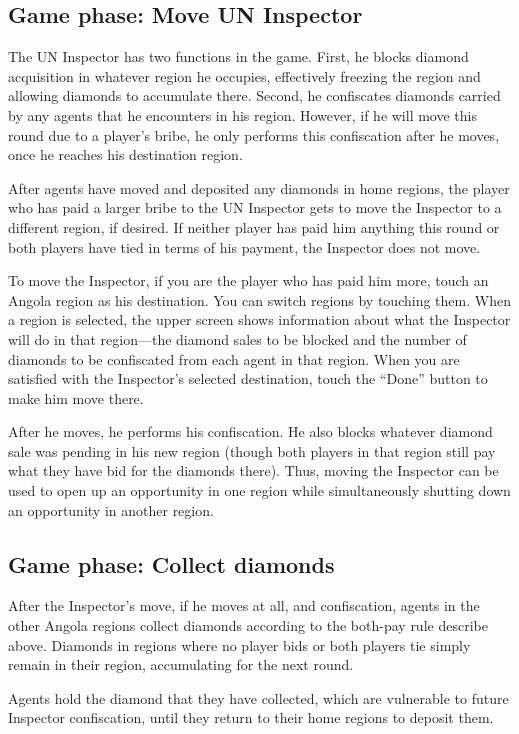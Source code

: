 \documentclass[8pt]{extbook}
\begin{document}
\subsection{Game phase:  Move UN Inspector}

The UN Inspector has two functions in the game.  First, he blocks diamond acquisition in whatever region he occupies, effectively freezing the region and allowing diamonds to accumulate there.  Second, he confiscates diamonds carried by any agents that he encounters in his region.  However, if he will move this round due to a player's bribe, he only performs this confiscation after he moves, once he reaches his destination region.

After agents have moved and deposited any diamonds in home regions, the player who has paid a larger bribe to the UN Inspector gets to move the Inspector to a different region, if desired.  If neither player has paid him anything this round or both players have tied in terms of his payment, the Inspector does not move.

To move the Inspector, if you are the player who has paid him more, touch an Angola region as his destination.  You can switch regions by touching them.  When a region is selected, the upper screen shows information about what the Inspector will do in that region---the diamond sales to be blocked and the number of diamonds to be confiscated from each agent in that region.  When you are satisfied with the Inspector's selected destination, touch the ``Done'' button to make him move there.

After he moves, he performs his confiscation.  He also blocks whatever diamond sale was pending in his new region (though both players in that region still pay what they have bid for the diamonds there).  Thus, moving the Inspector can be used to open up an opportunity in one region while simultaneously shutting down an opportunity in another region.

\subsection{Game phase:  Collect diamonds}

After the Inspector's move, if he moves at all, and confiscation, agents in the other Angola regions collect diamonds according to the both-pay rule describe above.  Diamonds in regions where no player bids or both players tie simply remain in their region, accumulating for the next round.

Agents hold the diamond that they have collected, which are vulnerable to future Inspector confiscation, until they return to their home regions to deposit them.
\end{document}
